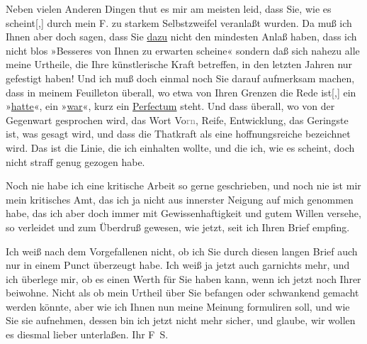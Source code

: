 \pstart
           Neben vielen Anderen Dingen thut es mir am meisten leid, dass Sie, wie es
                  scheint{[},{]} durch mein F. zu starkem Selbstzweifel veranlaßt wurden. Da muß ich
               Ihnen aber doch sagen, dass Sie \uline{dazu} nicht den
               mindesten Anlaß haben, dass ich nicht blos »Besseres von Ihnen zu erwarten scheine«
               sondern daß sich nahezu alle meine Urtheile, die Ihre künstlerische Kraft betreffen,
               in den letzten Jahren nur gefestigt haben! Und ich muß {\pb}doch einmal noch Sie darauf
               aufmerksam machen, dass in meinem Feuilleton überall, wo etwa von Ihren Grenzen die Rede
                  ist{[},{]} ein »\uline{hatte}«, ein »\uline{war}«, kurz ein \uline{Perfectum} steht. Und dass überall, wo von der Gegenwart gesprochen wird, das
               Wort Vo\textcolor{gray}{rn}, Reife, Entwicklung, das Geringste ist, was gesagt wird,
               und dass die Thatkraft als eine hoffnungsreiche bezeichnet wird. Das ist die Linie,
               die ich einhalten wollte, und die ich, wie es scheint, doch nicht straff genug
               gezogen habe.\pend
           
\pstart
           Noch nie habe ich eine kritische Arbeit so gerne geschrieben, und noch nie ist mir
               mein kritisches Amt, das ich ja nicht aus innerster Neigung auf mich genommen habe,
               das ich aber doch immer mit Gewissenhaftigkeit und gutem Willen versehe, so verleidet
               und zum Überdruß gewesen, wie jetzt, seit ich Ihren Brief empfing.\pend
           
\pstart
           Ich weiß nach dem Vorgefallenen nicht, ob ich Sie durch diesen langen Brief auch nur
               in einem Punct überzeugt habe. Ich weiß ja jetzt auch garnichts mehr, und ich
               überlege mir, ob es einen Werth für Sie haben kann, wenn ich jetzt noch Ihrer \label{K_L03353-10v}\label{K_L03353-10} beiwohne. Nicht als ob mein Urtheil über Sie befangen oder schwankend gemacht
               werden könnte, aber wie ich Ihnen nun meine Meinung formuliren soll, und wie Sie sie
               aufnehmen, dessen bin ich jetzt nicht mehr sicher, und glaube, wir wollen es diesmal
               lieber unterlaßen.\pend
           \pstart Ihr \spacefill\mbox{F S.}\pend{}\endnumbering{}  
      